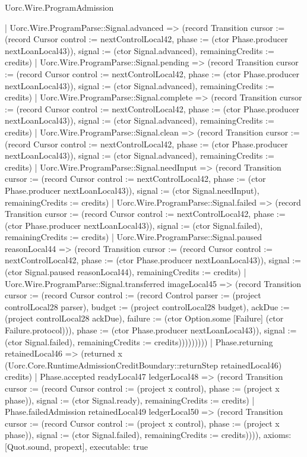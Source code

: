 \begin{lexlean}{Uorc.Wire.ProgramAdmission}
\begin{semanticmodule}
{            | Uorc.Wire.ProgramParse::Signal.advanced => (record Transition {cursor := (record Cursor {control := nextControlLocal42, phase := (ctor Phase.producer nextLoanLocal43)}), signal := (ctor Signal.advanced), remainingCredits := credits})
            | Uorc.Wire.ProgramParse::Signal.pending => (record Transition {cursor := (record Cursor {control := nextControlLocal42, phase := (ctor Phase.producer nextLoanLocal43)}), signal := (ctor Signal.advanced), remainingCredits := credits})
            | Uorc.Wire.ProgramParse::Signal.complete => (record Transition {cursor := (record Cursor {control := nextControlLocal42, phase := (ctor Phase.producer nextLoanLocal43)}), signal := (ctor Signal.advanced), remainingCredits := credits})
            | Uorc.Wire.ProgramParse::Signal.clean => (record Transition {cursor := (record Cursor {control := nextControlLocal42, phase := (ctor Phase.producer nextLoanLocal43)}), signal := (ctor Signal.advanced), remainingCredits := credits})
            | Uorc.Wire.ProgramParse::Signal.needInput => (record Transition {cursor := (record Cursor {control := nextControlLocal42, phase := (ctor Phase.producer nextLoanLocal43)}), signal := (ctor Signal.needInput), remainingCredits := credits})
            | Uorc.Wire.ProgramParse::Signal.failed => (record Transition {cursor := (record Cursor {control := nextControlLocal42, phase := (ctor Phase.producer nextLoanLocal43)}), signal := (ctor Signal.failed), remainingCredits := credits})
            | Uorc.Wire.ProgramParse::Signal.paused reasonLocal44 => (record Transition {cursor := (record Cursor {control := nextControlLocal42, phase := (ctor Phase.producer nextLoanLocal43)}), signal := (ctor Signal.paused reasonLocal44), remainingCredits := credits})
            | Uorc.Wire.ProgramParse::Signal.transferred imageLocal45 => (record Transition {cursor := (record Cursor {control := (record Control {parser := (project controlLocal28 parser), budget := (project controlLocal28 budget), ackDue := (project controlLocal28 ackDue), failure := (ctor Option.some [Failure] (ctor Failure.protocol))}), phase := (ctor Phase.producer nextLoanLocal43)}), signal := (ctor Signal.failed), remainingCredits := credits})))))))))
      | Phase.returning retainedLocal46 => (returned x (Uorc.Core.RuntimeAdmissionCreditBoundary::returnStep retainedLocal46) credits)
      | Phase.accepted readyLocal47 ledgerLocal48 => (record Transition {cursor := (record Cursor {control := (project x control), phase := (project x phase)}), signal := (ctor Signal.ready), remainingCredits := credits})
      | Phase.failedAdmission retainedLocal49 ledgerLocal50 => (record Transition {cursor := (record Cursor {control := (project x control), phase := (project x phase)}), signal := (ctor Signal.failed), remainingCredits := credits})))),
  axioms: [Quot.sound, propext],
  executable: true
}


\end{semanticmodule}
\end{lexlean}

